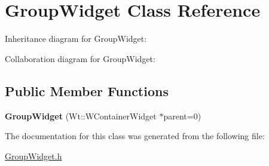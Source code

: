 \hypertarget{classGroupWidget}{}\section{Group\+Widget Class Reference}
\label{classGroupWidget}


Inheritance diagram for Group\+Widget\+:


Collaboration diagram for Group\+Widget\+:
\subsection*{Public Member Functions}
\begin{DoxyCompactItemize}
\item 
\mbox{\label{classGroupWidget_a37ffec864888c5398fe702e388fa6a5b}} 
{\bfseries Group\+Widget} (Wt\+::\+W\+Container\+Widget $\ast$parent=0)
\end{DoxyCompactItemize}


The documentation for this class was generated from the following file\+:\begin{DoxyCompactItemize}
\item 
\hyperlink{GroupWidget_8h}{Group\+Widget.\+h}\end{DoxyCompactItemize}

